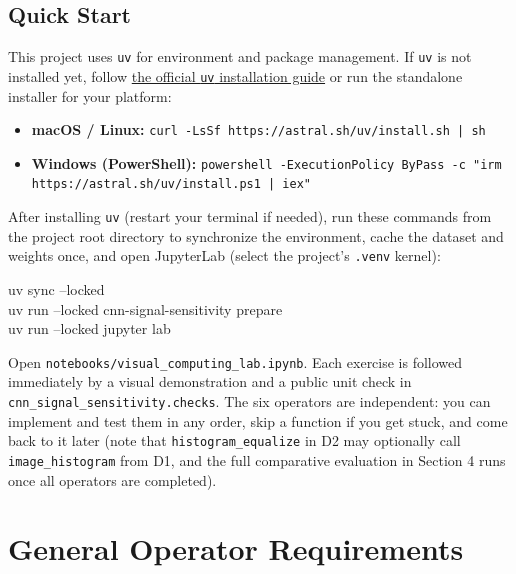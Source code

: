 \documentclass[11pt,letterpaper]{article}
\newcommand{\code}[1]{\texttt{\textcolor{primary}{#1}}}
\begin{document}
\subsection{Quick Start}
This project uses \code{uv} for environment and package management. If \code{uv} is not installed yet, follow \href{https://docs.astral.sh/uv/getting-started/installation/}{the official \code{uv} installation guide} or run the standalone installer for your platform:
\begin{itemize}[itemsep=0.12em,topsep=0.08em,parsep=0pt]
  \item \textbf{macOS / Linux:} {\small\code{curl -LsSf https://astral.sh/uv/install.sh | sh}}
  \item \textbf{Windows (PowerShell):}
        {\small\code{powershell -ExecutionPolicy ByPass -c "irm https://astral.sh/uv/install.ps1 | iex"}}
\end{itemize}
After installing \code{uv} (restart your terminal if needed), run these commands from the project root directory to synchronize the environment, cache the dataset and weights once, and open JupyterLab (select the project's \code{.venv} kernel):
\vspace{0.5em}
\begin{codeblock}
  uv sync --locked\\
  uv run --locked cnn-signal-sensitivity prepare\\
  uv run --locked jupyter lab
\end{codeblock}
\vspace{0.5em}
Open \code{notebooks/visual\_computing\_lab.ipynb}. Each exercise is followed immediately by a visual demonstration and a public unit check in \code{cnn\_signal\_sensitivity.checks}. The six operators are independent: you can implement and test them in any order, skip a function if you get stuck, and come back to it later (note that \code{histogram\_equalize} in D2 may optionally call \code{image\_histogram} from D1, and the full comparative evaluation in Section 4 runs once all operators are completed).

\section{General Operator Requirements}
\end{document}
